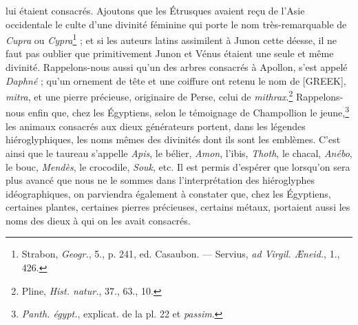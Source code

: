 \documentclass[a4paper, 11pt, oneside, polutonikogreek, french]{article}
\begin{document}
lui étaient consacrés. Ajoutons que les Étrusques avaient reçu de l'Asie occidentale le culte d'une divinité féminine qui porte le nom très-remarquable de \emph{Cupra} ou \emph{Cypra}\footnote{Strabon, \emph{Geogr.}, 5., p. 241, ed. Casaubon. --- Servius, \emph{ad Virgil. Æneid.}, 1., 426.} ; et si les auteurs latins assimilent à Junon cette déesse, il ne faut pas oublier que primitivement Junon et Vénus étaient une seule et même divinité. Rappelons-nous aussi qu'un des arbres consacrés à Apollon, s'est appelé \emph{Daphné} ; qu'un ornement de tête et une coiffure ont retenu le nom de [GREEK], \emph{mitra}, et une pierre précieuse, originaire de Perse, celui de \emph{mithrax}.\footnote{Pline, \emph{Hist. natur.}, 37., 63., 10.} Rappelons-nous enfin que, chez les Égyptiens, selon le témoignage de Champollion le jeune,\footnote{\emph{Panth. égypt.}, explicat. de la pl. 22 et \emph{passim}.} les animaux consacrés aux dieux générateurs portent, dans les légendes hiéroglyphiques, les noms mêmes des divinités dont ils sont les emblèmes. C'est ainsi que le taureau s'appelle \emph{Apis}, le bélier, \emph{Amon}, l'ibis, \emph{Thoth}, le chacal, \emph{Anébo}, le bouc, \emph{Mendès}, le crocodile, \emph{Souk}, etc. Il est permis d'espérer que lorsqu'on sera plus avancé que nous ne le sommes dans l'interprétation des hiéroglyphes idéographiques, on parviendra également à constater que, chez les Égyptiens, certaines plantes, certaines pierres précieuses, certains métaux, portaient aussi les noms des dieux à qui on les avait consacrés.
\end{document}
